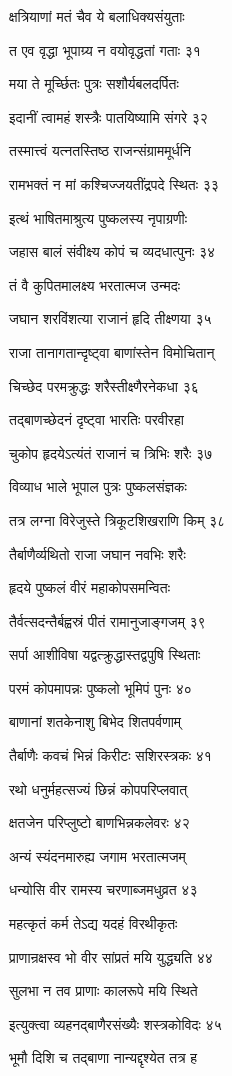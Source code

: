 क्षत्रियाणां मतं चैव ये बलाधिक्यसंयुताः

त एव वृद्धा भूपाग्र्य न वयोवृद्धतां गताः ३१

मया ते मूर्च्छितः पुत्रः सशौर्यबलदर्पितः

इदानीं त्वामहं शस्त्रैः पातयिष्यामि संगरे ३२

तस्मात्त्वं यत्नतस्तिष्ठ राजन्संग्राममूर्धनि

रामभक्तं न मां कश्चिज्जयतींद्रपदे स्थितः ३३

इत्थं भाषितमाश्रुत्य पुष्कलस्य नृपाग्रणीः

जहास बालं संवीक्ष्य कोपं च व्यदधात्पुनः ३४

तं वै कुपितमालक्ष्य भरतात्मज उन्मदः

जघान शरविंशत्या राजानं हृदि तीक्ष्णया ३५

राजा तानागतान्दृष्ट्वा बाणांस्तेन विमोचितान्

चिच्छेद परमक्रुद्धः शरैस्तीक्ष्णैरनेकधा ३६

तद्बाणच्छेदनं दृष्ट्वा भारतिः परवीरहा

चुकोप हृदयेऽत्यंतं राजानं च त्रिभिः शरैः ३७

विव्याध भाले भूपाल पुत्रः पुष्कलसंज्ञकः

तत्र लग्ना विरेजुस्ते त्रिकूटशिखराणि किम् ३८

तैर्बाणैर्व्यथितो राजा जघान नवभिः शरैः

हृदये पुष्कलं वीरं महाकोपसमन्वितः

तैर्वत्सदन्तैर्बह्वस्रं पीतं रामानुजाङ्गजम् ३९

सर्पा आशीविषा यद्वत्क्रुद्धास्तद्वपुषि स्थिताः

परमं कोपमापन्नः पुष्कलो भूमिपं पुनः ४०

बाणानां शतकेनाशु बिभेद शितपर्वणाम्

तैर्बाणैः कवचं भिन्नं किरीटः सशिरस्त्रकः ४१

रथो धनुर्महत्सज्यं छिन्नं कोपपरिप्लवात्

क्षतजेन परिप्लुष्टो बाणभिन्नकलेवरः ४२

अन्यं स्यंदनमारुह्य जगाम भरतात्मजम्

धन्योसि वीर रामस्य चरणाब्जमधुव्रत ४३

महत्कृतं कर्म तेऽद्य यदहं विरथीकृतः

प्राणान्रक्षस्व भो वीर सांप्रतं मयि युद्ध्यति ४४

सुलभा न तव प्राणाः कालरूपे मयि स्थिते

इत्युक्त्वा व्यहनद्बाणैरसंख्यैः शस्त्रकोविदः ४५

भूमौ दिशि च तद्बाणा नान्यद्दृश्येत तत्र ह


